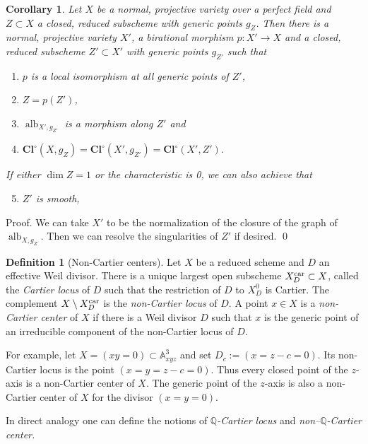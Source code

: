 \documentclass{amsart}
\newtheorem{cor}[thm]{Corollary}
\theoremstyle{definition}
\newtheorem{defn}[thm]{Definition}
\theoremstyle{remark}
\renewcommand{\a}[0]{{\mathbb A}}
\newcommand{\q}[0]{{\mathbb Q}}
\newcommand{\clos}[0]{\operatorname{\mathbf{Cl}^{\circ}}}
\newcommand{\albm}[0]{\operatorname{alb}}
\begin{document}



\begin{cor} \label{pico.bir.mod.cor}
Let $X$ be a normal, projective variety over a perfect field and $Z\subset X$ a closed, reduced subscheme with generic points $g_Z$. 
Then there is a  normal, projective variety $X'$, a birational morphism
$p:X'\to X$ and a  closed, reduced subscheme $Z'\subset X'$ 
 with generic points $g_{Z'}$
such that
\begin{enumerate}
\item $p$ is a local isomorphism at all generic points of $Z'$,
\item  $Z=p(Z')$,
\item  $\albm_{X',g_{Z'}}$ is a morphism along $Z'$ and
\item   $\clos(X,g_Z)=\clos(X',g_{Z'})=\clos(X',Z')$.
\end{enumerate}
If either $\dim Z=1$ or the characteristic is 0, we can also achieve that
\begin{enumerate}\setcounter{enumi}{4}
\item $Z'$ is smooth, 
\end{enumerate}
\end{cor}

Proof.  We can take $X'$ to be the
normalization of the closure of the graph of $\albm_{X,g_Z}$. 
Then we can  resolve the singularities of $Z'$  if desired. 
\qed



\medskip

\begin{defn}[Non-Cartier centers]\label{non.car.cent.defn} 
Let $X$ be a reduced scheme and $D$ an effective  Weil divisor.  There is a unique largest open subscheme $X^{\rm car}_D\subset X$, called the {\it Cartier locus} of $D$   such that the restriction of $D$ to  
$X^0_D$ is Cartier. The complement $X\setminus X^{\rm car}_D$ is 
the {\it non-Cartier locus} of $D$. A point
$x\in X$ is a {\it non-Cartier center} of $X$ if 
there is a  Weil divisor $D$ such that $x$ is the generic point of an irreducible component of the 
non-Cartier locus of $D$.

For example, let $X=(xy=0)\subset  \a^3_{xyz}$ and set
$D_c:=(x=z-c=0)$. Its non-Cartier locus is the point  $(x=y=z-c=0)$. 
Thus every closed point of the $z$-axis is a non-Cartier center of $X$.
The generic point of the $z$-axis is also a  non-Cartier center of $X$
for the divisor $(x=y=0)$. 

In direct analogy   one can define the notions of   {\it $\q$-Cartier locus} and  {\it non--$\q$-Cartier center.}
\end{defn}
\end{document}
